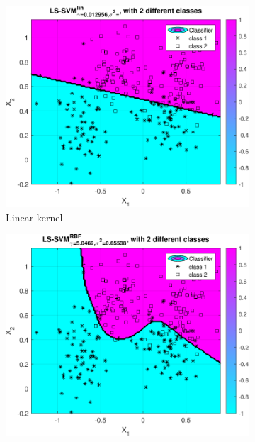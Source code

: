 \documentclass{article}
\begin{document}
            \begin{figure}[h]
                 \centering
                 \begin{subfigure}[b]{0.3\textwidth}
                     \centering
                     \includegraphics[width=\textwidth]{Assignment 1/figures/ripley_simplex_linear_classification_result.pdf}
                    \caption{Linear kernel}
                     \label{fig:ripley_linear_result}
                 \end{subfigure}
                 \hfill
                 \begin{subfigure}[b]{0.3\textwidth}
                     \centering
                     \includegraphics[width=\textwidth]{Assignment 1/figures/ripley_simplex_rbf_classification_result.pdf}

\end{subfigure}
\end{figure}
\end{document}
